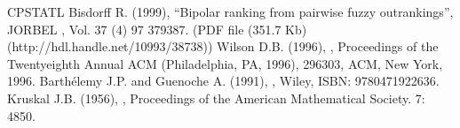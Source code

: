 \documentclass[a4paper,12pt,english]{sphinxhowto}
\begin{document}
\begin{sphinxthebibliography}{CPSTAT\sphinxhyphen{}L}
Bisdorff R. (1999), “Bipolar ranking from pairwise fuzzy outrankings”, JORBEL , Vol. 37 (4) 97 379\sphinxhyphen{}387. (PDF file (351.7 Kb)  (http://hdl.handle.net/10993/38738))
Wilson D.B. (1996), , Proceedings of the Twenty\sphinxhyphen{}eighth Annual ACM  (Philadelphia, PA, 1996), 296\sphinxhyphen{}303, ACM, New York, 1996.
Barthélemy J.\sphinxhyphen{}P. and Guenoche A. (1991), , Wiley, ISBN: 978\sphinxhyphen{}0471922636.
Kruskal J.B. (1956), , Proceedings of the American Mathematical Society. 7: 48\textendash{}50.
\end{sphinxthebibliography}



\renewcommand{\indexname}{Index}
\printindex
\end{document}
